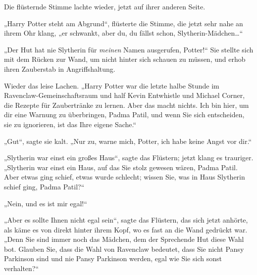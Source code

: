 Die flüsternde Stimme lachte wieder, jetzt auf ihrer anderen Seite.

„Harry Potter steht am Abgrund“, flüsterte die Stimme, die jetzt sehr nahe an ihrem Ohr klang, „er schwankt, aber du, du fällst schon, Slytherin-Mädchen…“

„Der Hut hat nie Slytherin für \emph{meinen} Namen ausgerufen, Potter!“ Sie stellte sich mit dem Rücken zur Wand, um nicht hinter sich schauen zu müssen, und erhob ihren Zauberstab in Angriffshaltung.

Wieder das leise Lachen. „Harry Potter war die letzte halbe Stunde im Ravenclaw-Gemeinschaftsraum und half Kevin Entwhistle und Michael Corner, die Rezepte für Zaubertränke zu lernen. Aber das macht nichts. Ich bin hier, um dir eine Warnung zu überbringen, Padma Patil, und wenn Sie sich entscheiden, sie zu ignorieren, ist das Ihre eigene Sache.“

„Gut“, sagte sie kalt. „Nur zu, warne mich, Potter, ich habe keine Angst vor dir.“

„Slytherin war einst ein großes Haus“, sagte das Flüstern; jetzt klang es trauriger. „Slytherin war einst ein Haus, auf das Sie stolz gewesen wären, Padma Patil. Aber etwas ging schief, etwas wurde schlecht; wissen Sie, was in Haus Slytherin schief ging, Padma Patil?“

„Nein, und es ist mir egal!“

„Aber es sollte Ihnen nicht egal sein“, sagte das Flüstern, das sich jetzt anhörte, als käme es von direkt hinter ihrem Kopf, wo es fast an die Wand gedrückt war. „Denn Sie sind immer noch das Mädchen, dem der Sprechende Hut diese Wahl bot. Glauben Sie, dass die Wahl von Ravenclaw bedeutet, dass Sie nicht Pansy Parkinson sind und nie Pansy Parkinson werden, egal wie Sie sich sonst verhalten?“

